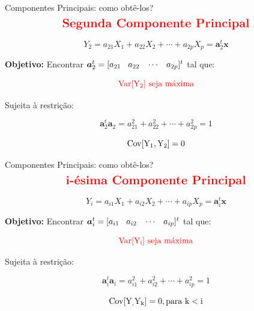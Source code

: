 \documentclass[
  ignorenonframetext,
  aspectratio=169,
]{beamer}
\begin{document}
\begin{frame}{Componentes Principais: como obtê-los?}
\label{componentes-principais-como-obtuxea-los-3}
\[
{\color{red}{\Large \textbf{Segunda Componente Principal}}}
\]

\[Y_2 = a_{21}X_1 + a_{22}X_2 + \cdots + a_{2p}X_p = \boldsymbol{a}_2^t \mathbf{x}\]

\pause

\textbf{Objetivo:} Encontrar
\(\boldsymbol{a}_2^t = [a_{21} \hspace{0.3cm} a_{22} \hspace{0.3cm} \cdots \hspace{0.3cm} a_{2p}]^t\)
tal que:

\[
{\color{red}{ \rm{Var}[Y_2]\ \text{seja máxima}}}
\]

\pause

Sujeita à restrição:

\[\boldsymbol{a}_2^t \boldsymbol{a}_2 = a_{21}^2 + a_{22}^2 + \cdots + a_{2p}^2 = 1\]

\[\rm{Cov}[Y_1,Y_2] = 0\]
\end{frame}

\begin{frame}{Componentes Principais: como obtê-los?}
\label{componentes-principais-como-obtuxea-los-4}
\[
{\color{red}{\Large \textbf{i-ésima Componente Principal}}}
\]

\[Y_i = a_{i1}X_1 + a_{i2}X_2 + \cdots + a_{ip}X_p = \boldsymbol{a}_i^t \mathbf{x}\]

\pause

\textbf{Objetivo:} Encontrar
\(\boldsymbol{a}_i^t = [a_{i1} \hspace{0.3cm} a_{i2} \hspace{0.3cm} \cdots \hspace{0.3cm} a_{ip}]^t\)
tal que:

\[
{\color{red}{ \rm{Var}[Y_i]\ \text{seja máxima}}}
\]

\pause

Sujeita à restrição:

\[\boldsymbol{a}_i^t \boldsymbol{a}_i =  a_{i1}^2 + a_{i2}^2 + \cdots + a_{ip}^2 = 1\]

\[\rm{Cov}[Y_,Y_k] = 0, \text{para  } k < i\]
\end{frame}
\end{document}
